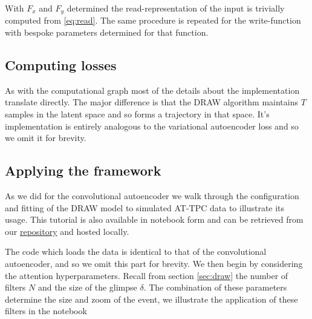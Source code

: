 With $F_x$ and $F_y$ determined the read-representation of the input is trivially computed from \ref{eq:read}. The same procedure is repeated for the write-function with bespoke parameters determined for that function.

\subsection{Computing losses}

As with the computational graph most of the details about the implementation translate directly. The major difference is that the DRAW algorithm maintains $T$ samples in the latent space and so forms a trajectory in that space. It's implementation is entirely analogous to the variational autoencoder loss and so we omit it for brevity. 

\subsection{Applying the framework}

As we did for the convolutional autoencoder we walk through the configuration and fitting of the DRAW model to simulated AT-TPC data to illustrate its usage. This tutorial is also available in notebook form and can be retrieved  from our \href{https://github.com/AkTTPC/VAE-event-classification/blob/master/notebooks/simulated_draw_tutorial.ipynb}{repository} and hosted locally.

The code which loads the data is identical to that of the convolutional autoencoder, and so we omit this part for brevity. We then begin by considering the attention hyperparameters. Recall from section \ref{sec:draw} the number of filters $N$ and the size of the glimpse $\delta$. The combination of these parameters determine the size and zoom of the event, we illustrate the application of these filters in the notebook 

